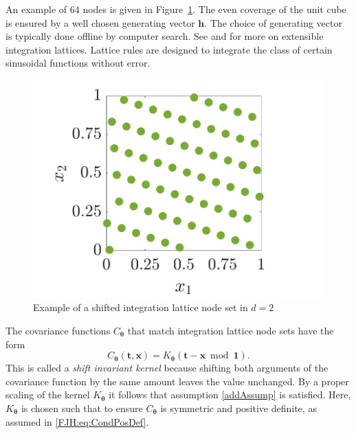 \documentclass{iitthesis}          %
\newcommand{\bm}[1]{\boldsymbol{#1}}
\newcommand{\vtheta}{{\bm{\theta}}}
\newcommand{\vh}{\bm{h}}
\newcommand{\vt}{\bm{t}}
\newcommand{\vx}{\bm{x}}
\newcommand{\vone}{\bm{1}}
\begin{document}
An example of $64$ nodes is given in Figure~\ref{latticefig}.  The even coverage of the unit cube is ensured by a well chosen generating vector $\vh$.  The choice of generating vector is typically done offline by computer search.  See \cite{DicEtal14a} and \cite{HicNie03a} for more on extensible integration lattices. Lattice rules are designed to integrate the class of certain sinusoidal functions without error.
\begin{figure}[htp]
	\centering
	\includegraphics[width=0.8\linewidth]{ShiftedLatticePoints}
	\caption{Example of a shifted integration lattice node set  in $d=2$ \label{latticefig} }
\end{figure}

\label{sec:shift_invar_kern}

The covariance functions $C_{\vtheta}$ that match integration lattice node sets have the form
\begin{equation} \label{eq:shInv}
C_{\vtheta}(\vt,\vx) = K_{\vtheta}(\vt - \vx \bmod \vone).
\end{equation}
This is called a \emph{shift invariant kernel} because shifting both arguments of the covariance function by the same amount leaves the value unchanged.   By a proper scaling of the kernel $K_{\vtheta}$ it follows that assumption \eqref{addAssump} is satisfied. 
Here, $K_{\vtheta}$ is chosen such that to ensure
$C_{\vtheta}$ is symmetric and positive definite, as assumed in \eqref{FJH:eq:CondPosDef}. 
\end{document}
